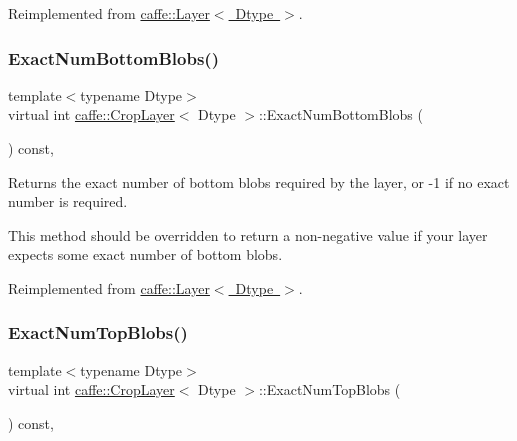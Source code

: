 Reimplemented from \mbox{\hyperlink{classcaffe_1_1_layer_a8e5ee0494d85f5f55fc4396537cbc60f}{caffe\+::\+Layer$<$ Dtype $>$}}.

\mbox{\label{classcaffe_1_1_crop_layer_ac6386917437ef54003bb7f8c2618f5fe}} 
\subsubsection{\texorpdfstring{Exact\+Num\+Bottom\+Blobs()}{ExactNumBottomBlobs()}\hspace{0.1cm}{\footnotesize\ttfamily [2/2]}}
{\footnotesize\ttfamily template$<$typename Dtype$>$ \\
virtual int \mbox{\hyperlink{classcaffe_1_1_crop_layer}{caffe\+::\+Crop\+Layer}}$<$ Dtype $>$\+::Exact\+Num\+Bottom\+Blobs (\begin{DoxyParamCaption}{ }\end{DoxyParamCaption}) const\hspace{0.3cm}{\ttfamily [inline]}, {\ttfamily [virtual]}}



Returns the exact number of bottom blobs required by the layer, or -\/1 if no exact number is required. 

This method should be overridden to return a non-\/negative value if your layer expects some exact number of bottom blobs. 

Reimplemented from \mbox{\hyperlink{classcaffe_1_1_layer_a8e5ee0494d85f5f55fc4396537cbc60f}{caffe\+::\+Layer$<$ Dtype $>$}}.

\mbox{\label{classcaffe_1_1_crop_layer_a7e4a9aa634577308bc189adcf0ac22ed}} 
\subsubsection{\texorpdfstring{Exact\+Num\+Top\+Blobs()}{ExactNumTopBlobs()}\hspace{0.1cm}{\footnotesize\ttfamily [1/2]}}
{\footnotesize\ttfamily template$<$typename Dtype$>$ \\
virtual int \mbox{\hyperlink{classcaffe_1_1_crop_layer}{caffe\+::\+Crop\+Layer}}$<$ Dtype $>$\+::Exact\+Num\+Top\+Blobs (\begin{DoxyParamCaption}{ }\end{DoxyParamCaption}) const\hspace{0.3cm}{\ttfamily [inline]}, {\ttfamily [virtual]}}



